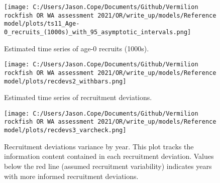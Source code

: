\documentclass[11pt,
  english,
  a4paper,
]{article}
\begin{document}
\tagmcend\tagstructend


\begin{figure}
\centering
\texttt{[image: C:/Users/Jason.Cope/Documents/Github/Vermilion rockfish OR WA assessment 2021/OR/write\_up/models/Reference model/plots/ts11\_Age-0\_recruits\_(1000s)\_with\_95\_asymptotic\_intervals.png]}
\caption{Estimated time series of age-0 recruits (1000s).\label{fig:recruits}}
\end{figure}

\tagmcend\tagstructend


\begin{figure}
\centering
\texttt{[image: C:/Users/Jason.Cope/Documents/Github/Vermilion rockfish OR WA assessment 2021/OR/write\_up/models/Reference model/plots/recdevs2\_withbars.png]}
\caption{Estimated time series of recruitment deviations.\label{fig:rec-devs}}
\end{figure}

\tagmcend\tagstructend


\begin{figure}
\centering
\texttt{[image: C:/Users/Jason.Cope/Documents/Github/Vermilion rockfish OR WA assessment 2021/OR/write\_up/models/Reference model/plots/recdevs3\_varcheck.png]}
\caption{Recruitment deviations variance by year. This plot tracks the information content contained in each recruitment deviation. Values below the red line (assumed recruitment variability) indicates years with more informed recruitment deviations.\label{fig:rec-devs-sigmas}}
\end{figure}

\tagmcend\tagstructend

\end{document}
